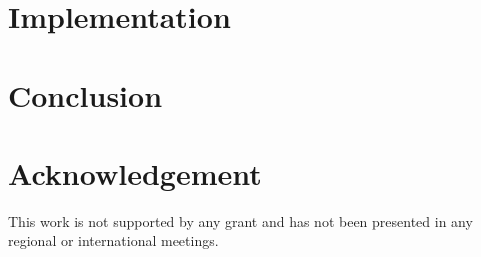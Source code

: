 \documentclass[english,listof=totoc]{scrartcl}
\begin{document}
\section{Implementation}\label{sec:implement}

\section{Conclusion}\label{sec:conclusion}

\section*{Acknowledgement}
This work is not supported by any grant and has not been presented in any regional or international meetings.



\end{document}
